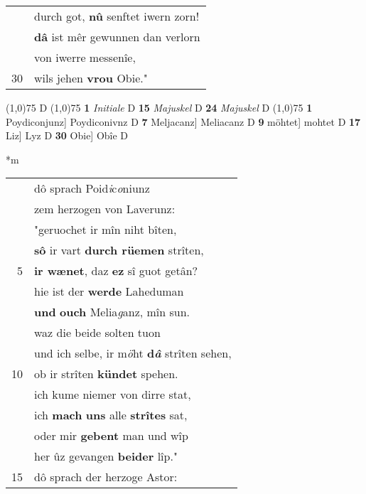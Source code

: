 \documentclass[8pt,a4paper,notitlepage]{article}
\begin{document}
\begin{table}[ht]
\begin{minipage}[t]{0.5\linewidth}
\begin{tabular}{rl}
 & durch got, \textbf{nû} senftet iwern zorn!\\ 
 & \textbf{dâ} ist mêr gewunnen dan verlorn\\ 
 & von iwerre messenîe,\\ 
30 & wils jehen \textbf{vrou} Obie."\\ 
\end{tabular}
\scriptsize
\line(1,0){75} \newline
D \newline
\line(1,0){75} \newline
\textbf{1} \textit{Initiale} D  \textbf{15} \textit{Majuskel} D  \textbf{24} \textit{Majuskel} D  \newline
\line(1,0){75} \newline
\textbf{1} Poydiconjunz] Poydiconivnz D \textbf{7} Meljacanz] Meliacanz D \textbf{9} möhtet] mohtet D \textbf{17} Liz] Lyz D \textbf{30} Obie] Obîe D \newline
\end{minipage}
\hspace{0.5cm}
\begin{minipage}[t]{0.5\linewidth}
\small
\begin{center}*m
\end{center}
\begin{tabular}{rl}
 & dô sprach Poid\textit{i}c\textit{o}niunz\\ 
 & zem herzogen von Laverunz:\\ 
 & "geruochet ir mîn niht bîten,\\ 
 & \textbf{sô} ir vart \textbf{durch rüemen} strîten,\\ 
5 & \textbf{ir wænet}, daz \textbf{ez} sî guot getân?\\ 
 & hie ist der \textbf{werde} Laheduman\\ 
 & \textbf{und} \textbf{ouch} Melia\textit{g}anz, mîn sun.\\ 
 & waz die beide solten tuon\\ 
 & und ich selbe, ir m\textit{ö}ht \textbf{d\textit{â}} strîten sehen,\\ 
10 & ob ir strîten \textbf{kündet} spehen.\\ 
 & ich kume niemer von dirre stat,\\ 
 & ich \textbf{mach} \textbf{uns} alle \textbf{strîtes} sat,\\ 
 & oder mir \textbf{gebent} man und wîp\\ 
 & her ûz gevangen \textbf{beider} lîp."\\ 
15 & dô sprach der herzoge Astor:\\ 

\end{tabular}
\end{minipage}
\end{table}
\end{document}
